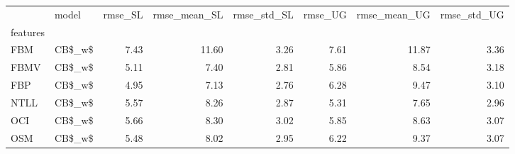 \begin{tabular}{llrrrrrr}
\toprule
{} &   model &  rmse\_SL &  rmse\_mean\_SL &  rmse\_std\_SL &  rmse\_UG &  rmse\_mean\_UG &  rmse\_std\_UG \\
features &         &          &               &              &          &               &              \\
\midrule
FBM      &  CB\$\_w\$ &     7.43 &         11.60 &         3.26 &     7.61 &         11.87 &         3.36 \\
FBMV     &  CB\$\_w\$ &     5.11 &          7.40 &         2.81 &     5.86 &          8.54 &         3.18 \\
FBP      &  CB\$\_w\$ &     4.95 &          7.13 &         2.76 &     6.28 &          9.47 &         3.10 \\
NTLL     &  CB\$\_w\$ &     5.57 &          8.26 &         2.87 &     5.31 &          7.65 &         2.96 \\
OCI      &  CB\$\_w\$ &     5.66 &          8.30 &         3.02 &     5.85 &          8.63 &         3.07 \\
OSM      &  CB\$\_w\$ &     5.48 &          8.02 &         2.95 &     6.22 &          9.37 &         3.07 \\
\bottomrule
\end{tabular}
